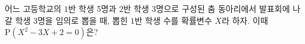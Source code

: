 어느 고등학교의 $1$반 학생 5명과 $2$반 학생 3명으로 구성된 춤 동아리에서 발표회에 나갈 학생 3명을 임의로 뽑을 때, 뽑힌 $1$반 학생 수를 확률변수 $X$라 하자. 이때 $\mathrm{P}(X^2-3X+2=0)$은?
